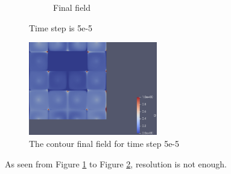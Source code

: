 \documentclass{article}
\begin{document}
\begin{figure}[hbt!]
\begin{subfigure}{0.4\textwidth}
        \caption{Final field}
  \end{subfigure}
  \caption{Time step is 5e-5}
  \label{t2m3_1} 
\end{figure}

\begin{figure}[hbt!]
    \centering
    \includegraphics[width=0.5\textwidth]{Figures/5e-5 80x80/contour.png}
    \caption{The contour final field for time step 5e-5}
    \label{t2m3_2} 
\end{figure}

As seen from Figure \ref{t2m3_1} to Figure \ref{t2m3_2}, resolution is not enough.


\clearpage
\end{document}
